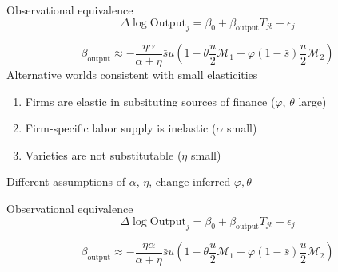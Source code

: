 \documentclass[english,xcolor=svgnames]{beamer}
\begin{document}
\begin{frame}{Observational equivalence}
$$\Delta \log \text{Output}_{j} = \beta_0 + \beta_{\text{output}} T_{jb} + \epsilon_{j}$$

$$\beta_{\text{output}} \approx -  \frac{\eta \alpha}{\alpha+\eta} \bar{s} u\left(1 - \theta  \frac{u}{2}\mathcal{M}_1 - \varphi (1-\bar{s}) \frac{u}{2} \mathcal{M}_2\right)$$
Alternative worlds consistent with small elasticities
\begin{enumerate}
\item Firms are elastic in subsituting sources of finance ($\varphi$, $\theta$ large)
\item Firm-specific labor supply is inelastic ($\alpha$ small)
\item Varieties are not substitutable ($\eta$ small)
\end{enumerate}
Different assumptions of $\alpha$, $\eta$, change inferred $\varphi, \theta$
\end{frame}


\begin{frame}{Observational equivalence}
$$\Delta \log \text{Output}_{j} = \beta_0 + \beta_{\text{output}} T_{jb} + \epsilon_{j}$$
\begin{figure}[H]
\centering
{}
\end{figure}
$$\beta_{\text{output}} \approx -  \frac{\eta \alpha}{\alpha+\eta} \bar{s} u\left(1 - \theta  \frac{u}{2}\mathcal{M}_1 - \varphi (1-\bar{s}) \frac{u}{2} \mathcal{M}_2\right)$$
\end{frame}
\end{document}
